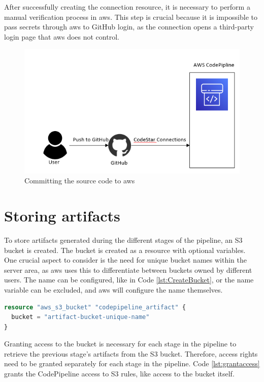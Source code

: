 After successfully creating the connection resource, it is necessary to perform a manual verification process in \acrshort{aws}. This step is crucial because it is impossible to pass secrets through \acrshort{aws} to GitHub login, as the connection opens a third-party login page that \acrshort{aws} does not control.

\vspace{2mm}
\begin{figure}[H]
    \centering
    \includegraphics[width=0.6\columnwidth]{Images/aws-piplin-2-1.png}
    \caption{Committing the source code to \acrshort{aws}}
    \label{fig: Committing the source code to AWS}
\end{figure}

\section{Storing artifacts}
To store \gls{artifact}s generated during the different stages of the \gls{pipeline}, an S3 bucket is created. The bucket is created as a resource with optional variables. One crucial aspect to consider is the need for unique bucket names within the server area, as \acrshort{aws} uses this to differentiate between buckets owned by different users. The name can be configured, like in Code \ref{lst:CreateBucket}, or the name variable can be excluded, and \acrshort{aws} will configure the name themselves.

\vspace{2mm}
\begin{lstlisting}[language=terraform, caption=Creation of an S3 Bucket, captionpos=b, frame=single, label=lst:CreateBucket]
resource "aws_s3_bucket" "codepipeline_artifact" {
  bucket = "artifact-bucket-unique-name"
}
\end{lstlisting}

Granting access to the bucket is necessary for each stage in the \gls{pipeline} to retrieve the previous stage's artifacts from the S3 bucket. Therefore, access rights need to be granted separately for each stage in the pipeline. Code \ref{lst:grantaccess} grants the CodePipeline access to S3 rules, like access to the bucket itself. 

